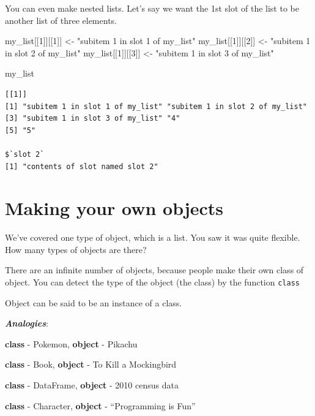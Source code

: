 \documentclass[
  letterpaper,
]{book}
\newenvironment{Shaded}{\begin{snugshade}}{\end{snugshade}}
\newcommand{\DecValTok}[1]{\textcolor[rgb]{0.68,0.00,0.00}{#1}}
\newcommand{\NormalTok}[1]{\textcolor[rgb]{0.00,0.23,0.31}{#1}}
\newcommand{\OtherTok}[1]{\textcolor[rgb]{0.00,0.23,0.31}{#1}}
\newcommand{\StringTok}[1]{\textcolor[rgb]{0.13,0.47,0.30}{#1}}
\theoremstyle{definition}
\theoremstyle{definition}
\theoremstyle{plain}
\theoremstyle{definition}
\theoremstyle{plain}
\theoremstyle{plain}
\theoremstyle{remark}
\begin{document}
You can even make nested lists. Let's say we want the 1st slot of the
list to be another list of three elements.

\begin{Shaded}
\begin{Highlighting}[]
\NormalTok{my\_list[[}\DecValTok{1}\NormalTok{]][[}\DecValTok{1}\NormalTok{]] }\OtherTok{\textless{}{-}} \StringTok{"subitem 1 in slot 1 of my\_list"}
\NormalTok{my\_list[[}\DecValTok{1}\NormalTok{]][[}\DecValTok{2}\NormalTok{]] }\OtherTok{\textless{}{-}} \StringTok{"subitem 1 in slot 2 of my\_list"}
\NormalTok{my\_list[[}\DecValTok{1}\NormalTok{]][[}\DecValTok{3}\NormalTok{]] }\OtherTok{\textless{}{-}} \StringTok{"subitem 1 in slot 3 of my\_list"}

\NormalTok{my\_list}
\end{Highlighting}
\end{Shaded}

\begin{verbatim}
[[1]]
[1] "subitem 1 in slot 1 of my_list" "subitem 1 in slot 2 of my_list"
[3] "subitem 1 in slot 3 of my_list" "4"                             
[5] "5"                             

$`slot 2`
[1] "contents of slot named slot 2"
\end{verbatim}

\hypertarget{making-your-own-objects}{%
\section{Making your own objects}\label{making-your-own-objects}}

We've covered one type of object, which is a list. You saw it was quite
flexible. How many types of objects are there?

There are an infinite number of objects, because people make their own
class of object. You can detect the type of the object (the class) by
the function \texttt{class}

Object can be said to be an instance of a class.

\textbf{\emph{Analogies}}:

\textbf{class} - Pokemon, \textbf{object} - Pikachu

\textbf{class} - Book, \textbf{object} - To Kill a Mockingbird

\textbf{class} - DataFrame, \textbf{object} - 2010 census data

\textbf{class} - Character, \textbf{object} - ``Programming is Fun''
\end{document}
